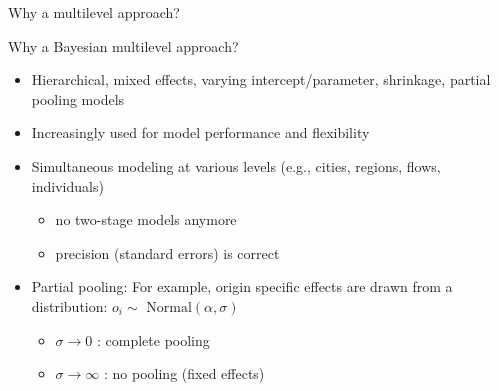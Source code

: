 \documentclass{beamer}
\begin{document}
\begin{frame}[fragile]{Why a \alert{multilevel} approach?}
\begin{description}
\begin{figure}
	\end{figure}
\end{description}
\end{frame}

\begin{frame}{Why a \alert{Bayesian} multilevel approach?}
\begin{itemize}
	\item Hierarchical, mixed effects, varying intercept/parameter, shrinkage, partial pooling models\pause
	\item Increasingly used for model \alert{performance} and \alert{flexibility} \pause
    \item \alert{Simultaneous} modeling at various levels (e.g., cities, regions, flows, individuals) 
    \begin{itemize}
    	\item no two-stage models anymore 
    	\item precision (standard errors) is correct\pause
    \end{itemize}
	\item \alert{Partial pooling}: For example, origin specific effects are drawn from a distribution: $o_{i} \sim \text{ Normal}(\alpha, \sigma)$
	\begin{itemize}
		\item $\sigma \longrightarrow 0$ : complete pooling
		\item $\sigma \longrightarrow \infty$ : no pooling (fixed effects)
	\end{itemize}
\end{itemize}
\end{frame}
\end{document}
